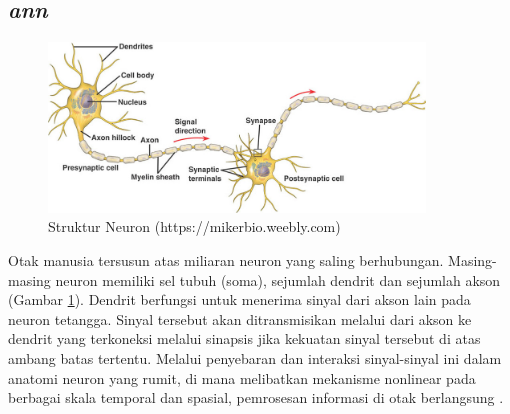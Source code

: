 


\subsection{\textit{\acrlong{ann}}}
\begin{figure}[t]
    \centering
    \includegraphics[width=10cm]{gambar/neuron.jpg}
    \caption[Struktur Neuron]{Struktur Neuron (https://mikerbio.weebly.com)}
    \label{fig:neuron}
\end{figure}
Otak manusia tersusun atas miliaran neuron yang saling berhubungan. Masing-masing neuron memiliki sel tubuh (soma), sejumlah dendrit dan sejumlah akson (Gambar \ref{fig:neuron}). Dendrit berfungsi untuk menerima sinyal dari akson lain pada neuron tetangga. Sinyal tersebut akan ditransmisikan melalui dari akson ke dendrit yang terkoneksi melalui sinapsis jika kekuatan sinyal tersebut di atas ambang batas tertentu. Melalui penyebaran dan interaksi sinyal-sinyal ini dalam anatomi neuron yang rumit, di mana melibatkan mekanisme nonlinear pada berbagai skala temporal dan spasial, pemrosesan informasi di otak berlangsung .

